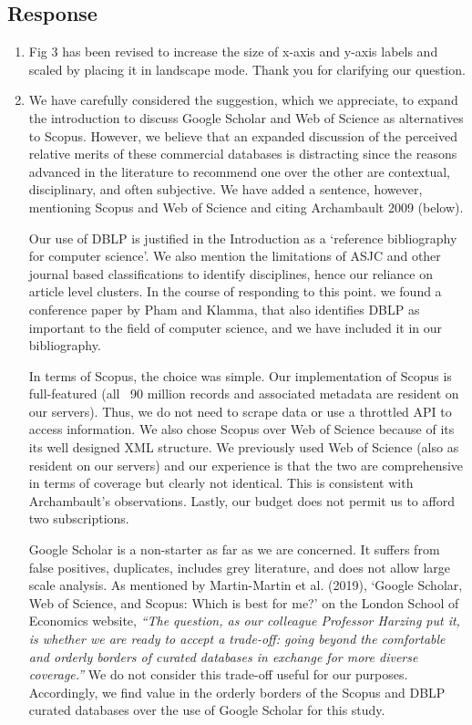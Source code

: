 \documentclass[11pt, oneside]{article}   	%
\begin{document}
\subsection*{Response}
\begin{enumerate}
\item Fig 3 has been revised to increase the size of x-axis and y-axis labels and scaled by placing it in landscape mode. Thank you for clarifying our question.
\item We have carefully considered the suggestion, which we appreciate, to expand the introduction to discuss Google Scholar and Web of Science as alternatives to Scopus. 
However, we believe that an expanded discussion of the perceived relative merits of these commercial databases is distracting since the reasons advanced in the literature to recommend one 
over the other are contextual, disciplinary, and often subjective. We have added a sentence, however, mentioning Scopus and Web of Science and citing Archambault 2009 (below).

Our use of DBLP is justified in the Introduction as a `reference bibliography for computer science'. We also mention the limitations of ASJC and other journal based classifications to identify 
disciplines, hence our reliance on article level clusters. In the course of responding to this point. we found a conference paper by Pham and Klamma, that also identifies DBLP as important 
to the field of computer science, and we have included it in our bibliography.

In terms of Scopus, the choice was simple. Our implementation of Scopus is full-featured (all ~90 million records and associated metadata are resident on our servers). Thus, we do not need to scrape 
data or use a throttled API to access information. We also chose Scopus over Web of Science because of its its well designed XML structure. We previously used Web of Science (also as resident on 
our servers) and our experience is that the two are comprehensive in terms of coverage but clearly not identical. This is consistent with Archambault's observations. Lastly, our budget does not permit us to afford two subscriptions. 

Google Scholar is a non-starter as far as we are concerned. It suffers from false positives, duplicates, includes grey literature, and does not allow large scale analysis. As mentioned by Martin-Martin et al. (2019),
`Google Scholar, Web of Science, and Scopus: Which is best for me?' on the London School of Economics website, \emph{``The question, as our colleague Professor Harzing put it, is whether 
we are ready to accept a trade-off: going beyond the comfortable and orderly borders of curated databases in exchange for more diverse coverage.''} We do not consider this trade-off useful for 
our purposes. Accordingly, we find value in the orderly borders of the Scopus and DBLP curated databases over the use of Google Scholar for this study.


\end{enumerate}
\end{document}
